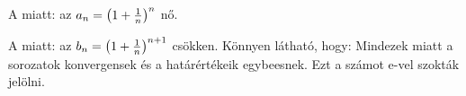 A \amgm{}miatt:
az $a_n={ \left( 1+\frac{1}{n} \right) }^{n}$ \szigmon{}nő.


A \gmhm{}miatt:
az $b_n={ \left( 1+\frac{1}{n} \right) }^{n+1}$ \szigmon{}csökken.
Könnyen látható, hogy:
Mindezek miatt a sorozatok konvergensek és a határértékeik egybeesnek. Ezt
a számot e-vel szokták jelölni.
